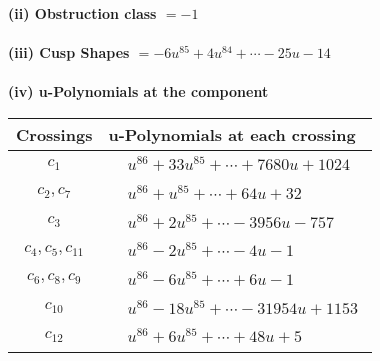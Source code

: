 \documentclass[1p]{elsarticle_modified}
\theoremstyle{definition}
\begin{document}
\flushleft \textbf{(ii) Obstruction class $= -1$}\\~\\
\flushleft \textbf{(iii) Cusp Shapes $= -6 u^{85}+4 u^{84}+\cdots-25 u-14$}\\~\\
\newpage\renewcommand{\arraystretch}{1}
\flushleft \textbf{(iv) u-Polynomials at the component}\newline \\
\begin{tabular}{m{50pt}|m{274pt}}
Crossings & \hspace{64pt}u-Polynomials at each crossing \\
\hline $$\begin{aligned}c_{1}\end{aligned}$$&$\begin{aligned}
&u^{86}+33 u^{85}+\cdots+7680 u+1024
\end{aligned}$\\
\hline $$\begin{aligned}c_{2},c_{7}\end{aligned}$$&$\begin{aligned}
&u^{86}+u^{85}+\cdots+64 u+32
\end{aligned}$\\
\hline $$\begin{aligned}c_{3}\end{aligned}$$&$\begin{aligned}
&u^{86}+2 u^{85}+\cdots-3956 u-757
\end{aligned}$\\
\hline $$\begin{aligned}c_{4},c_{5},c_{11}\end{aligned}$$&$\begin{aligned}
&u^{86}-2 u^{85}+\cdots-4 u-1
\end{aligned}$\\
\hline $$\begin{aligned}c_{6},c_{8},c_{9}\end{aligned}$$&$\begin{aligned}
&u^{86}-6 u^{85}+\cdots+6 u-1
\end{aligned}$\\
\hline $$\begin{aligned}c_{10}\end{aligned}$$&$\begin{aligned}
&u^{86}-18 u^{85}+\cdots-31954 u+1153
\end{aligned}$\\
\hline $$\begin{aligned}c_{12}\end{aligned}$$&$\begin{aligned}
&u^{86}+6 u^{85}+\cdots+48 u+5
\end{aligned}$\\
\hline
\end{tabular}\\~\\
\end{document}
